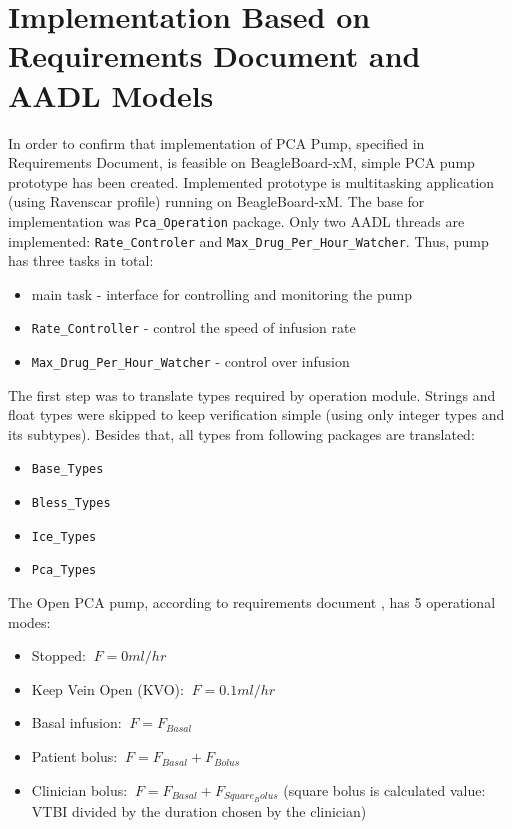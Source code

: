 \section{Implementation Based on Requirements Document and AADL Models}
\label{pcapumpimpl:manual}

In order to confirm that implementation of PCA Pump, specified in Requirements Document, is feasible on BeagleBoard-xM, simple PCA pump prototype has been created. Implemented prototype is multitasking application (using Ravenscar profile) running on BeagleBoard-xM. The base for implementation was \lstinline{Pca_Operation} package. Only two AADL threads are implemented: \lstinline{Rate_Controler} and \lstinline{Max_Drug_Per_Hour_Watcher}. Thus, pump has three tasks in total:
\begin{itemize}
    \item main task - interface for controlling and monitoring the pump
    \item \lstinline{Rate_Controller} - control the speed of infusion rate
    \item \lstinline{Max_Drug_Per_Hour_Watcher} - control over infusion
\end{itemize}

The first step was to translate types required by operation module. Strings and float types were skipped to keep verification simple (using only integer types and its subtypes). Besides that, all types from following packages are translated:
\begin{itemize}
	\item \lstinline{Base_Types}
	\item \lstinline{Bless_Types}
	\item \lstinline{Ice_Types}
	\item \lstinline{Pca_Types}
\end{itemize}

The Open PCA pump, according to requirements document \cite{PcaReq}, has 5 operational modes:
\begin{itemize}
	\item Stopped: $\displaystyle\ F = 0 ml/hr$
	\item Keep Vein Open (KVO): $\displaystyle\ F = 0.1 ml/hr$
	\item Basal infusion: $\displaystyle\ F = F_{Basal}$
	\item Patient bolus: $\displaystyle\ F = F_{Basal} + F_{Bolus}$
	\item Clinician bolus: $\displaystyle\ F = F_{Basal} + F_{Square_Bolus}$ (square bolus is calculated value: VTBI divided by the duration chosen by the clinician)
\end{itemize}

